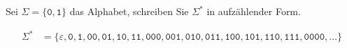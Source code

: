 Sei $\Sigma = \{\texttt{0},\texttt{1}\}$ das Alphabet, schreiben
Sie $\Sigma^*$ in aufzählender Form.

\begin{loesung}
\begin{align*}
\Sigma^*
&=
\{\varepsilon, \texttt{0}, \texttt{1},
\texttt{00}, \texttt{01}, \texttt{10}, \texttt{11},
\texttt{000},
\texttt{001},
\texttt{010},
\texttt{011},
\texttt{100},
\texttt{101},
\texttt{110},
\texttt{111},
\texttt{0000},
\dots
\}
\end{align*}
\end{loesung}
